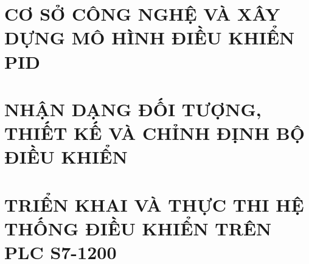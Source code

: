 \documentclass[a4paper,13pt,3p,oneside]{report}
\renewcommand{\headrulewidth}{0pt}
\theoremstyle{definition}
\begin{document}
\pagestyle{plain}
\renewcommand{\listtablename}{DANH MỤC BẢNG BIỂU}
{\let\oldnumberline\numberline
\renewcommand{\numberline}{Bảng~\oldnumberline}
\listoftables}
\thispagestyle{plain}

\renewcommand*{\acronymname}{}
\renewcommand*{\descriptionname}{Ý nghĩa}

\renewcommand*{\entryname}{Thuật ngữ/từ viết tắt}

\renewcommand{\arraystretch}{1.5} %

\printnoidxglossary[type=acronym,
                    title={DANH MỤC TỪ VIẾT TẮT},
                    toctitle={Danh sách thuật ngữ/viết tắt}]




\newpage
{}

\pagestyle{fancy}
\fancyhf{}
\renewcommand{\headrulewidth}{0.4pt}
\setlength{\headheight}{14pt}
\makeatletter
\renewcommand{\chaptermark}[1]{\markboth{CHƯƠNG \thechapter.\ #1}{}}
\makeatother
\fancyhead[LO]{\nouppercase{\leftmark}}
\fancyhead[RE]{\nouppercase{\leftmark}}
\fancyfoot[RO]{\thepage}
\renewcommand{\sectionmark}[1]{}

\chapter{CƠ SỞ CÔNG NGHỆ VÀ XÂY DỰNG MÔ HÌNH ĐIỀU KHIỂN PID}
\label{chuong1}

\newpage
\chapter{NHẬN DẠNG ĐỐI TƯỢNG, THIẾT KẾ VÀ CHỈNH ĐỊNH BỘ ĐIỀU KHIỂN}
\label{chuong2}


\newpage
\chapter{TRIỂN KHAI VÀ THỰC THI HỆ THỐNG ĐIỀU KHIỂN TRÊN PLC S7-1200}
\label{chuong3}

\end{document}
